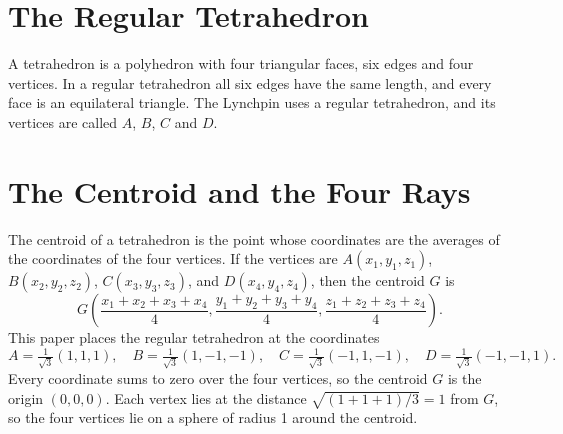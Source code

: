\documentclass[a4paper,12pt]{article}
\begin{document}
\section{The Regular Tetrahedron}
\label{sec:tetra}
A tetrahedron is a polyhedron with four triangular faces, six edges and four vertices. In a regular tetrahedron all six edges have the same length, and every face is an equilateral triangle. The Lynchpin uses a regular tetrahedron, and its vertices are called \( A \), \( B \), \( C \) and \( D \).

\begin{center}
\end{center}


\section{The Centroid and the Four Rays}
The centroid of a tetrahedron is the point whose coordinates are the averages of the coordinates of the four vertices. If the vertices are \( A(x_1, y_1, z_1) \), \( B(x_2, y_2, z_2) \), \( C(x_3, y_3, z_3) \), and \( D(x_4, y_4, z_4) \), then the centroid \( G \) is
\[
G \left( \frac{x_1 + x_2 + x_3 + x_4}{4}, \frac{y_1 + y_2 + y_3 + y_4}{4}, \frac{z_1 + z_2 + z_3 + z_4}{4} \right) .
\]
This paper places the regular tetrahedron at the coordinates
\[
A = \tfrac{1}{\sqrt{3}}(1, 1, 1), \quad B = \tfrac{1}{\sqrt{3}}(1, -1, -1), \quad C = \tfrac{1}{\sqrt{3}}(-1, 1, -1), \quad D = \tfrac{1}{\sqrt{3}}(-1, -1, 1) .
\]
Every coordinate sums to zero over the four vertices, so the centroid \( G \) is the origin \( (0, 0, 0) \). Each vertex lies at the distance \( \sqrt{(1 + 1 + 1)/3} = 1 \) from \( G \), so the four vertices lie on a sphere of radius 1 around the centroid.
\end{document}
